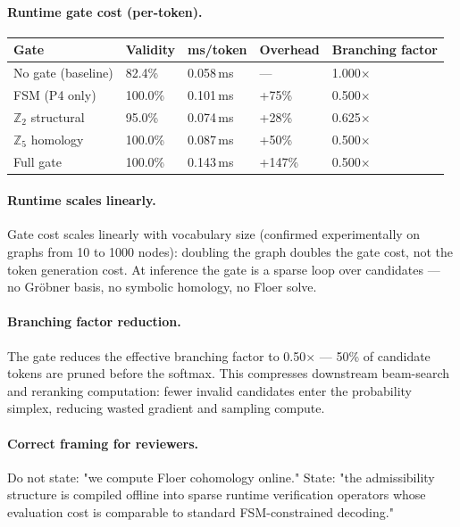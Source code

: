 \documentclass[11pt,a4paper]{article}
\begin{document}
\paragraph{Runtime gate cost (per-token).}

\begin{center}
\renewcommand{\arraystretch}{1.3}\small
\begin{tabularx}{\linewidth}{p{3.0cm}p{1.8cm}p{2.0cm}p{2.0cm}X}
\toprule
\textbf{Gate} & \textbf{Validity} & \textbf{ms/token} & \textbf{Overhead} &
\textbf{Branching factor} \\
\midrule
No gate (baseline)  & 82.4\% & 0.058\,ms & --- & 1.000$\times$ \\
FSM (P4 only)       & 100.0\% & 0.101\,ms & +75\% & 0.500$\times$ \\
$\mathbb{Z}_2$ structural & 95.0\% & 0.074\,ms & +28\% & 0.625$\times$ \\
$\mathbb{Z}_5$ homology   & 100.0\% & 0.087\,ms & +50\% & 0.500$\times$ \\
Full gate           & 100.0\% & 0.143\,ms & +147\% & 0.500$\times$ \\
\bottomrule
\end{tabularx}
\end{center}

\paragraph{Runtime scales linearly.}
Gate cost scales linearly with vocabulary size (confirmed experimentally
on graphs from 10 to 1000 nodes): doubling the graph doubles the gate
cost, not the token generation cost.
At inference the gate is a sparse loop over candidates --- no Gröbner
basis, no symbolic homology, no Floer solve.

\paragraph{Branching factor reduction.}
The gate reduces the effective branching factor to 0.50$\times$ ---
50\% of candidate tokens are pruned before the softmax.
This compresses downstream beam-search and reranking computation:
fewer invalid candidates enter the probability simplex, reducing
wasted gradient and sampling compute.

\paragraph{Correct framing for reviewers.}
Do not state: "we compute Floer cohomology online."
State: "the admissibility structure is compiled offline into sparse
runtime verification operators whose evaluation cost is comparable
to standard FSM-constrained decoding."
\end{document}
